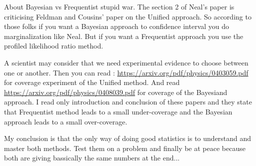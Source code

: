 About Bayesian vs Frequentist stupid war.
The section 2 of Neal's paper is criticising Feldman and Cousins' paper on the Unified approach.
So according to those folks if you want a Bayesian approach to confidence interval you do marginalization like Neal.
But if you want a Frequentist approach you use the profiled likelihood ratio method.

A scientist may consider that we need experimental evidence to choose between one or another.
Then you can read : \url{https://arxiv.org/pdf/physics/0403059.pdf} for coverage experiment of the Unified method.
And read \url{https://arxiv.org/pdf/physics/0408039.pdf} for coverage of the Bayesiand approach.
I read only introduction and conclusion of these papers and they state that Frequentist method leads to a small under-coverage and the Bayesian approach leads to a small over-coverage.

My conclusion is that the only way of doing good statistics is to understand and master both methods.
Test them on a problem and finally be at peace because both are giving bassically the same numbers at the end...

